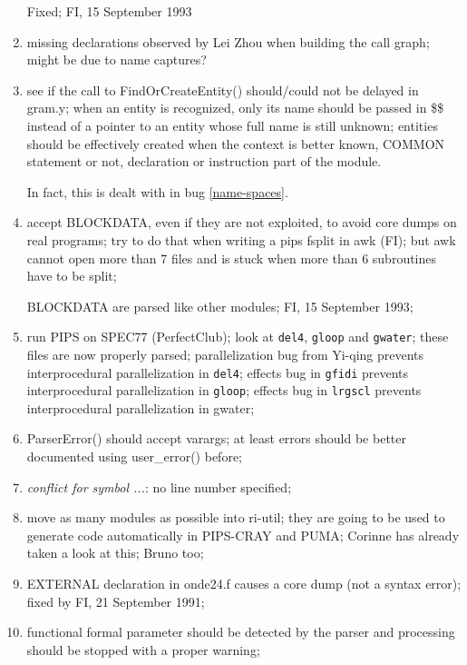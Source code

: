 \begin{enumerate}
	Fixed; FI, 15 September 1993

  \item missing declarations observed by Lei Zhou when building the call
	graph; might be due to name captures?

  \item see if the call to FindOrCreateEntity() should/could not be delayed
	in gram.y; when an entity is recognized, only its name should
	be passed in \$\$ instead of a pointer to an entity whose full name
	is still unknown; entities should be effectively created when the
	context is better known, COMMON statement or not, declaration
	or instruction part of the module.

	In fact, this is dealt with in bug \ref{name-spaces}.

  \item accept BLOCKDATA, even if they are not exploited, to avoid core
	dumps on real programs; try to do that when writing a pips fsplit
	in awk (FI); but awk cannot open more than 7 files and is stuck
	when more than 6 subroutines have to be split;

	BLOCKDATA are parsed like other modules; FI, 15 September 1993;

  \item run PIPS on SPEC77 (PerfectClub); look at \verb+del4+, \verb+gloop+ and \verb+gwater+;
	these files are now properly parsed; parallelization bug from
	Yi-qing prevents interprocedural parallelization in \verb+del4+; effects
	bug in \verb+gfidi+ prevents interprocedural parallelization in \verb+gloop+;
	effects bug in \verb+lrgscl+ prevents interprocedural parallelization in
	gwater;

  \item ParserError() should accept varargs; at least errors should be better
	documented using user\_error() before;

  \item {\em conflict for symbol ...}: no line number specified;

  \item move as many modules as possible into ri-util; they are going to
	be used to generate code automatically in PIPS-CRAY and PUMA;
	Corinne has already taken a look at this; Bruno too;

  \item EXTERNAL declaration in onde24.f causes a core dump (not a syntax
	error); fixed by FI, 21 September 1991;

  \item functional formal parameter should be detected by the parser and
	processing should be stopped with a proper warning;


\end{enumerate}
